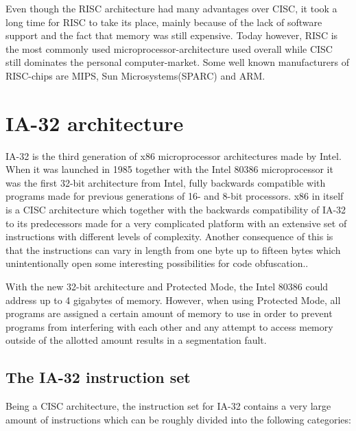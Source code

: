 \documentclass[11pt,twoside]{eitExjobb}
\begin{document}
\noindent Even though the RISC architecture had many advantages over CISC, it took a long time for RISC to take its place, mainly because of the lack of software support and the fact that memory was still expensive. Today however, RISC is the most commonly used microprocessor-architecture used overall while CISC still dominates the personal computer-market. Some well known manufacturers of RISC-chips are MIPS, Sun Microsystems(SPARC) and ARM.\cite{datorteknik}

\section{IA-32 architecture}
IA-32 is the third generation of  x86 microprocessor architectures made by Intel. When it was launched in 1985 together with the Intel 80386 microprocessor it was the first 32-bit architecture from Intel, fully backwards compatible with programs made for previous generations of 16- and 8-bit processors. x86 in itself is a CISC architecture which together with the backwards compatibility of IA-32 to its predecessors made for a very complicated platform with an extensive set of instructions with different levels of complexity. Another consequence of this is that the instructions can vary in length from one byte up to fifteen bytes which unintentionally open some interesting possibilities for code obfuscation.. 

With the new 32-bit architecture and Protected Mode, the Intel 80386 could address up to 4 gigabytes of memory. However, when using Protected Mode, all programs are assigned a certain amount of memory to use in order to prevent programs from interfering with each other and any attempt to access memory outside of the allotted amount results in a segmentation fault.

\subsection{The IA-32 instruction set}
Being a CISC architecture, the instruction set for IA-32 contains a very large amount of instructions which can be roughly divided into the following categories:\cite{x86quickguide}\cite{artofassembly} 
\end{document}
